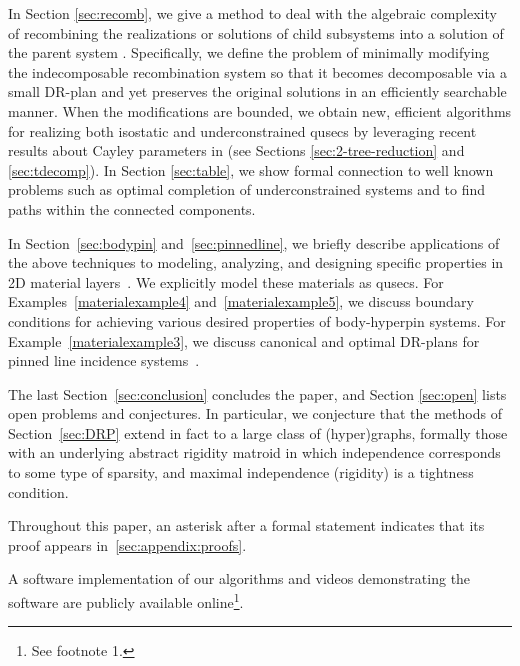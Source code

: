 In Section \ref{sec:recomb}, we give a method to deal with the algebraic complexity of recombining the realizations or solutions of child subsystems into a solution of the parent system \cite{sitharam2010optimized,sitharam2006well,sitharam2010reconciling}. Specifically, we define the problem of minimally modifying the indecomposable recombination system so that it becomes decomposable via a small DR-plan and yet preserves the original solutions in an efficiently searchable manner.
%
When the modifications are bounded, we obtain new, efficient algorithms for realizing both isostatic and underconstrained qusecs by leveraging recent results about Cayley parameters in \cite{sitharam2010convex,sitharam2011cayleyI,sitharam2011cayleyII} (see Sections \ref{sec:2-tree-reduction} and \ref{sec:tdecomp}).
%
In Section \ref{sec:table}, we show formal connection to well known problems such as optimal completion of underconstrained systems \cite{joan-arinyo2003transforming,sitharam2005combinatorial,gao2006ctree} and to find paths within the connected components.



In Section~\ref{sec:bodypin} and~\ref{sec:pinnedline}, we briefly describe applications of the above techniques to modeling, analyzing, and designing specific properties in 2D material layers~\cite{Jackson2008bodypin}. We explicitly model these materials as qusecs. For Examples~\ref{materialexample4} and~\ref{materialexample5}, we discuss boundary conditions for achieving various desired properties of body-hyperpin systems. For Example~\ref{materialexample3}, we discuss canonical and optimal DR-plans for pinned line incidence systems~\cite{sitharam2014incidence}.

The last Section~\ref{sec:conclusion} concludes the paper, and Section \ref{sec:open} lists open problems and conjectures. In particular, we conjecture that the methods of Section~\ref{sec:DRP} extend in fact to a large class of (hyper)graphs, formally those with an underlying abstract rigidity matroid in which independence corresponds to some type of sparsity, and maximal independence (rigidity) is a tightness condition.

Throughout this paper,  an asterisk after a formal statement indicates that its proof appears in~\ref{sec:appendix:proofs}.


A software implementation of our algorithms and videos demonstrating the software are publicly available online\footnote{See footnote 1.}.
